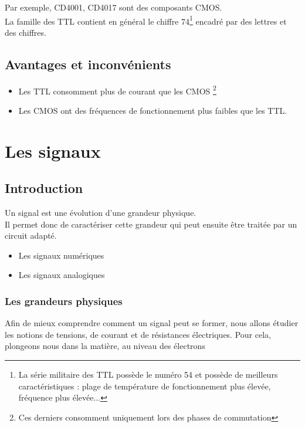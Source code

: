 \documentclass[12pt]{report}
\begin{document}
Par exemple, CD4001, CD4017 sont des composants CMOS. \\



La famille des TTL contient en général le chiffre 74\footnote{La série militaire des TTL possède le numéro 54 et possède de meilleurs caractéristiques : plage de température de fonctionnement plus élevée, fréquence plus élevée...} encadré par des lettres et des chiffres. \\





\section{Avantages et inconvénients}

\begin{itemize}
    \item Les TTL consomment plus de courant que les CMOS \footnote{Ces derniers consomment uniquement lors des phases de commutation}
    \item Les CMOS ont des fréquences de fonctionnement plus faibles que les TTL.
\end{itemize}

\chapter{Les signaux}

\section{Introduction}

Un signal est une évolution d'une grandeur physique.\\
Il permet donc de caractériser cette grandeur qui peut ensuite être traitée par un circuit adapté.


\begin{itemize}
    \item Les signaux numériques
    \item Les signaux analogiques
\end{itemize} 

\subsection{Les grandeurs physiques}

Afin de mieux comprendre comment un signal peut se former, nous allons étudier les notions de tensions, de courant et de résistances électriques.
Pour cela, plongeons nous dans la matière, au niveau des électrons
\end{document}
